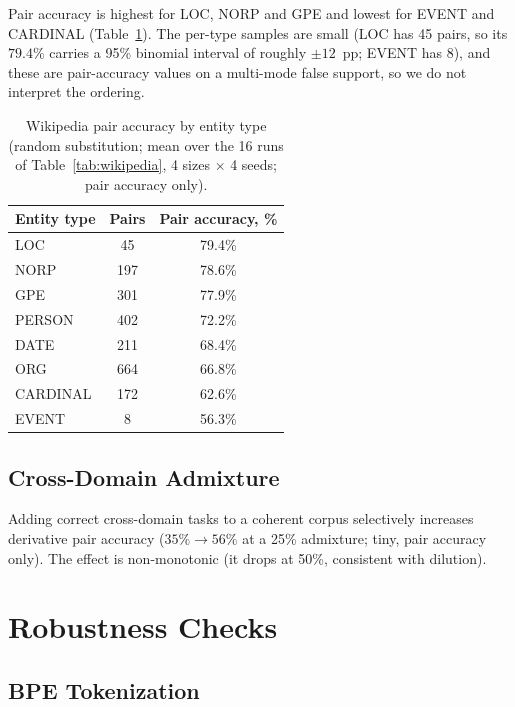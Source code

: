\documentclass{article}
\begin{document}
Pair accuracy is highest for LOC, NORP and GPE and lowest for EVENT and CARDINAL (Table~\ref{tab:wiki_entity}). The per-type samples are small (LOC has 45 pairs, so its $79.4\%$ carries a 95\% binomial interval of roughly $\pm 12$~pp; EVENT has 8), and these are pair-accuracy values on a multi-mode false support, so we do not interpret the ordering.

\begin{table}[ht]
\centering
\small
\begin{tabular}{lcc}
\toprule
Entity type & Pairs & Pair accuracy, \% \\
\midrule
LOC      & 45  & 79.4\% \\
NORP     & 197 & 78.6\% \\
GPE      & 301 & 77.9\% \\
PERSON   & 402 & 72.2\% \\
DATE     & 211 & 68.4\% \\
ORG      & 664 & 66.8\% \\
CARDINAL & 172 & 62.6\% \\
EVENT    & 8   & 56.3\% \\
\bottomrule
\end{tabular}
\caption{Wikipedia pair accuracy by entity type (random substitution; mean over the 16 runs of Table~\ref{tab:wikipedia}, 4 sizes $\times$ 4 seeds; pair accuracy only).}
\label{tab:wiki_entity}
\end{table}

\subsection{Cross-Domain Admixture}

Adding correct cross-domain tasks to a coherent corpus selectively increases derivative pair accuracy ($35\% \to 56\%$ at a 25\% admixture; tiny, pair accuracy only). The effect is non-monotonic (it drops at 50\%, consistent with dilution).

\section{Robustness Checks}
\label{app:robustness}

\subsection{BPE Tokenization}
\end{document}
